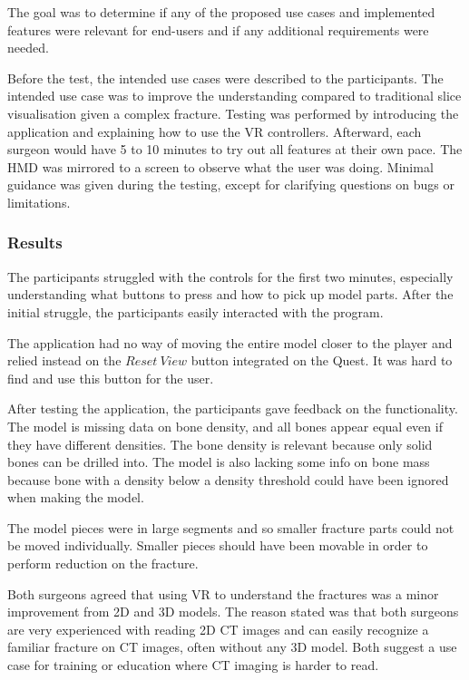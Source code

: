 \documentclass[a4paper]{report}
\begin{document}
The goal was to determine if any of the proposed use cases and implemented features were relevant for end-users and if any additional requirements were needed.

Before the test, the intended use cases were described to the participants. The intended use case was to improve the understanding compared to traditional slice visualisation given a complex fracture.
Testing was performed by introducing the application and explaining how to use the VR controllers. Afterward, each surgeon would have 5 to 10 minutes to try out all features at their own pace. The HMD was mirrored to a screen to observe what the user was doing. Minimal guidance was given during the testing, except for clarifying questions on bugs or limitations.

\subsubsection{Results}
The participants struggled with the controls for the first two minutes, especially understanding what buttons to press and how to pick up model parts. After the initial struggle, the participants easily interacted with the program.

The application had no way of moving the entire model closer to the player and relied instead on the $Reset\ View$ button integrated on the Quest. It was hard to find and use this button for the user.

After testing the application, the participants gave feedback on the functionality.
The model is missing data on bone density, and all bones appear equal even if they have different densities. The bone density is relevant because only solid bones can be drilled into. The model is also lacking some info on bone mass because bone with a density below a density threshold could have been ignored when making the model.

The model pieces were in large segments and so smaller fracture parts could not be moved individually. Smaller pieces should have been movable in order to perform reduction on the fracture.

Both surgeons agreed that using VR to understand the fractures was a minor improvement from 2D and 3D models.
The reason stated was that both surgeons are very experienced with reading 2D CT images and can easily recognize a familiar fracture on CT images, often without any 3D model. Both suggest a use case for training or education where CT imaging is harder to read.
\end{document}
